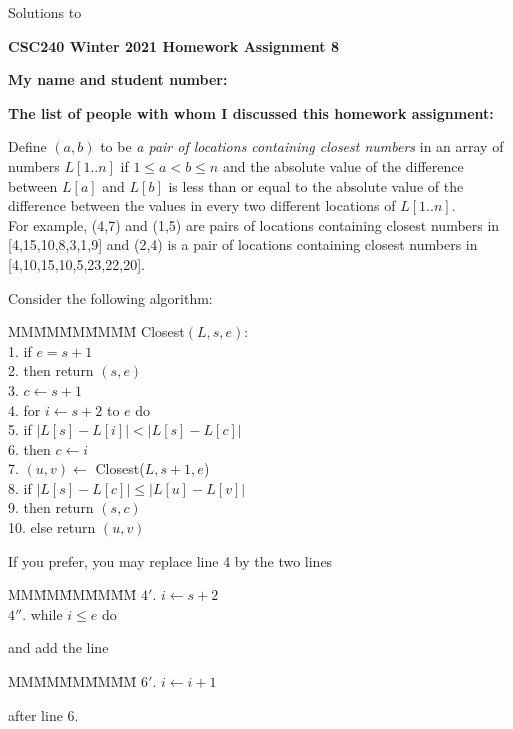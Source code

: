 \documentclass[11pt]{article}
\begin{document}
\begin{center}
\begin{solution}
Solutions to
\end{solution}

{\bf \Large \bf CSC240 Winter 2021 Homework Assignment 8}\\
\end{center}

\noindent
{\bf My name and student number:}

\medskip

\noindent
{\bf The list of people with whom I discussed this homework assignment:}

\medskip

\begin{question}
\noindent
Define $(a,b)$ to be {\em a pair of locations containing closest numbers} in an array of numbers $L[1..n]$
if $1 \leq a < b \leq n$ and
the absolute value of the difference between $L[a]$ and $L[b]$ is less than or equal to the absolute value of the difference between the values in every two different locations of  $L[1..n]$.\\
For example,
(4,7) and (1,5) are pairs of locations containing closest numbers in [4,15,10,8,3,1,9] 
and (2,4) is a pair of locations containing closest numbers in [4,10,15,10,5,23,22,20].

\noindent
Consider the following algorithm:
\begin{tabbing}
MM\=MM\=MM\=MM\=MM\=\kill
Closest$(L,s,e)$:\\
1.\> if $e = s+1$\\
2.\> \>  then return $(s, e)$\\
3.\>  $c \leftarrow s+1$\\
4.\> for $i  \leftarrow s+2$ to $e$ do\\
5.\> \> if $\left| L[s]-L[i]\right| < \left| L[s]-L[c]\right|$\\
6.\> \> then $c \leftarrow i$\\
7.\>  $(u,v) \leftarrow$ Closest($L,s+1,e$)\\
8.\>  if $\left| L[s]-L[c] \right| \leq \left| L[u] - L[v ]\right|$\\ 
9.\>  then return $(s,c)$ \\
10.\> else return $(u,v)$
\end{tabbing}

\noindent
If you prefer, you may replace line 4 by the two lines
\begin{tabbing}
MM\=MM\=MM\=MM\=MM\=\kill
$4'$. \> $i \leftarrow s+2$\\
$4''$. \> while $i \leq e$ do
\end{tabbing}
and add the line
\begin{tabbing}
MM\=MM\=MM\=MM\=MM\=\kill
$6'$. \>\> $i \leftarrow i+1$
\end{tabbing}
after line 6.
\end{question}
\end{document}
